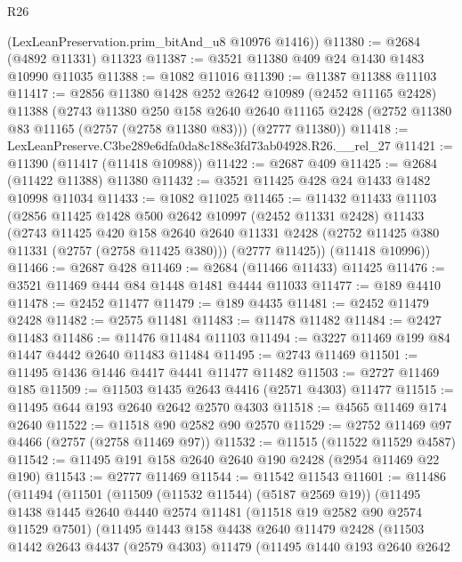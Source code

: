 \begin{lexlean}{R26}
\begin{coremodule}
      (LexLeanPreservation.prim_bitAnd_u8 @10976 @1416))
@11380 := @2684 (@4892 @11331) @11323
@11387 := @3521 @11380 @409 @24 @1430 @1483 @10990 @11035
@11388 := @1082 @11016
@11390 := @11387 @11388 @11103
@11417 := @2856
    @11380
    @1428
    @252
    @2642
    @10989
    (@2452 @11165 @2428)
    @11388
    (@2743
      @11380
      @250
      @158
      @2640
      @2640
      @11165
      @2428
      (@2752 @11380 @83 @11165 (@2757 (@2758 @11380 @83)))
      (@2777 @11380))
@11418 := LexLeanPreserve.C3be289e6dfa0da8c188e3fd73ab04928.R26.__rel_27
@11421 := @11390 (@11417 (@11418 @10988))
@11422 := @2687 @409
@11425 := @2684 (@11422 @11388) @11380
@11432 := @3521 @11425 @428 @24 @1433 @1482 @10998 @11034
@11433 := @1082 @11025
@11465 := @11432
    @11433
    @11103
    (@2856
      @11425
      @1428
      @500
      @2642
      @10997
      (@2452 @11331 @2428)
      @11433
      (@2743
        @11425
        @420
        @158
        @2640
        @2640
        @11331
        @2428
        (@2752 @11425 @380 @11331 (@2757 (@2758 @11425 @380)))
        (@2777 @11425))
      (@11418 @10996))
@11466 := @2687 @428
@11469 := @2684 (@11466 @11433) @11425
@11476 := @3521 @11469 @444 @84 @1448 @1481 @4444 @11033
@11477 := @189 @4410
@11478 := @2452 @11477
@11479 := @189 @4435
@11481 := @2452 @11479 @2428
@11482 := @2575 @11481
@11483 := @11478 @11482
@11484 := @2427 @11483
@11486 := @11476 @11484 @11103
@11494 := @3227 @11469 @199 @84 @1447 @4442 @2640 @11483 @11484
@11495 := @2743 @11469
@11501 := @11495 @1436 @1446 @4417 @4441 @11477 @11482
@11503 := @2727 @11469 @185
@11509 := @11503 @1435 @2643 @4416 (@2571 @4303) @11477
@11515 := @11495 @644 @193 @2640 @2642 @2570 @4303
@11518 := @4565 @11469 @174 @2640
@11522 := @11518 @90 @2582 @90 @2570
@11529 := @2752 @11469 @97 @4466 (@2757 (@2758 @11469 @97))
@11532 := @11515 (@11522 @11529 @4587)
@11542 := @11495 @191 @158 @2640 @2640 @190 @2428 (@2954 @11469 @22 @190)
@11543 := @2777 @11469
@11544 := @11542 @11543
@11601 := @11486
    (@11494
      (@11501
        (@11509 (@11532 @11544) (@5187 @2569 @19))
        (@11495
          @1438
          @1445
          @2640
          @4440
          @2574
          @11481
          (@11518 @19 @2582 @90 @2574 @11529 @7501)
          (@11495
            @1443
            @158
            @4438
            @2640
            @11479
            @2428
            (@11503
              @1442
              @2643
              @4437
              (@2579 @4303)
              @11479
              (@11495
                @1440
                @193
                @2640
                @2642

\end{coremodule}
\end{lexlean}
